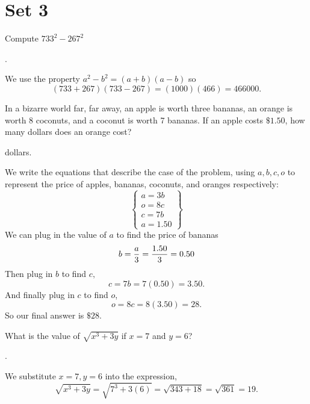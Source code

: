 \documentclass[11pt]{article}
\DeclareRobustCommand{\frac}[3][0pt]{%
  {\begingroup\hspace{#1}#2\hspace{#1}\endgroup\over\hspace{#1}#3\hspace{#1}}}
\begin{document}
\eject

\section*{Set 3}

\begin{problem}
Compute $733^2-267^2$
\end{problem}
\begin{answer}
.
\end{answer}
\begin{solution}
We use the property $a^2-b^2 = (a+b)(a-b)$ so
$$(733+267)(733-267) = (1000)(466) = \boxed{466000}.$$
\end{solution}

\begin{problem}In a bizarre world far, far away, an apple is worth three bananas, an orange is worth 8 coconuts, and a coconut is worth 7 bananas. If an apple costs $\$1.50$, how many dollars does an orange cost?
\end{problem}
\begin{answer}
 dollars.
\end{answer}
\begin{solution}
We write the equations that describe the case of the problem, using $a, b, c, o$ to represent the price of apples, bananas, coconuts, and oranges respectively:
 \[
	\left\{
            	\begin{array}{ll}
              	a=3b\\
              	o=8c\\
              	c=7b \\
a=1.50
            	\end{array}
	\right\}
  \]
We can plug in the value of $a$ to find the price of bananas
$$b=\frac{a}{3} = \frac{1.50}{3} = 0.50$$
Then plug in $b$ to find $c,$
$$c=7b = 7(0.50) = 3.50.$$
And finally plug in $c$ to find $o$,
$$o=8c=8(3.50)=28.$$
So our final answer is $\boxed{\$ 28}$.
\end{solution}


\begin{problem}What is the value of $\sqrt{x^{3}+3y}$ if $x=7$ and $y=6$?
\end{problem}
\begin{answer}
.
\end{answer}
\begin{solution}
We substitute $x=7, y=6$ into the expression,
$$\sqrt{x^{3}+3y}=\sqrt{7^3+3(6)}=\sqrt{343+18}=\sqrt{361}=\boxed{19}.$$
\end{solution}
\end{document}
